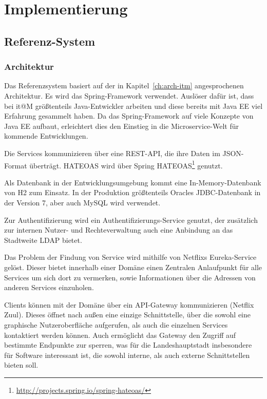 \documentclass[12pt,a4paper,bibliography=totocnumbered,listof=totocnumbered]{scrartcl}
\begin{document}
\section{Implementierung}\label{ch:implementierung}

\subsection{Referenz-System}

\subsubsection{Architektur}

Das Referenzsystem basiert auf der in Kapitel~\ref{ch:arch-itm} angesprochenen Architektur. Es wird das Spring-Framework verwendet. Auslöser dafür ist, dass bei it@M größtenteils Java-Entwickler arbeiten und diese bereits mit Java EE viel Erfahrung gesammelt haben. Da das Spring-Framework auf viele Konzepte von Java EE aufbaut, erleichtert dies den Einstieg in die Microservice-Welt für kommende Entwicklungen.

Die Services kommunizieren über eine REST-\ac{API}, die ihre Daten im JSON-Format überträgt. \ac{HATEOAS} wird über Spring \ac{HATEOAS}\footnote{\url{http://projects.spring.io/spring-hateoas/}} genutzt.

Als Datenbank in der Entwicklungsumgebung kommt eine In-Memory-Datenbank von H2 zum Einsatz. In der Produktion größtenteils Oracles JDBC-Datenbank in der Version 7, aber auch MySQL wird verwendet.

Zur Authentifizierung wird ein Authentifizierungs-Service genutzt, der zusätzlich zur internen Nutzer- und Rechteverwaltung auch eine Anbindung an das Stadtweite \ac{LDAP} bietet.

Das Problem der Findung von Service wird mithilfe von Netflixs Eureka-Service gelöst. Dieser bietet innerhalb einer Domäne einen Zentralen Anlaufpunkt für alle Services um sich dort zu vermerken, sowie Informationen über die Adressen von anderen Services einzuholen.

Clients können mit der Domäne über ein \ac{API}-Gateway kommunizieren (Netflix Zuul). Dieses öffnet nach außen eine einzige Schnittstelle, über die sowohl eine graphische Nutzeroberfläche aufgerufen, als auch die einzelnen Services kontaktiert werden können. Auch ermöglicht das Gateway den Zugriff auf bestimmte Endpunkte zur sperren, was für die Landeshauptstadt insbesondere für Software interessant ist, die sowohl interne, als auch externe Schnittstellen bieten soll.
\end{document}
